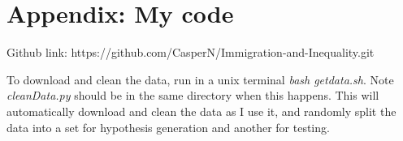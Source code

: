 \documentclass[11pt]{article}
\theoremstyle{definition}
\theoremstyle{remark}
\begin{document}
\section{Appendix: My code}

Github link: https://github.com/CasperN/Immigration-and-Inequality.git

To download and clean the data, run in a unix terminal \textit{bash getdata.sh}.
Note \textit{cleanData.py} should be in the same directory when this happens.
This will automatically download and clean the data as I use it, and randomly
split the data into a set for hypothesis generation and another for testing.

\listoffigures
\listoftables

\end{document}
